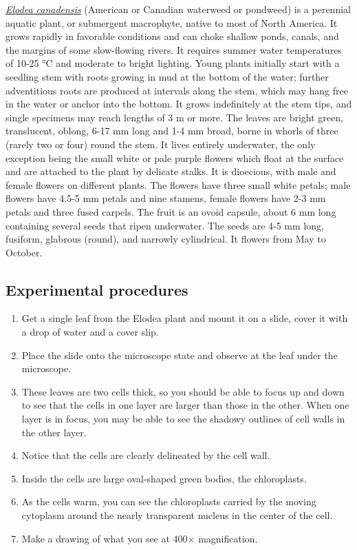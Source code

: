 \href{https://en.wikipedia.org/wiki/Elodea_canadensis}{\emph{Elodea
canadensis}} (American or Canadian waterweed or pondweed) is a perennial
aquatic plant, or submergent macrophyte, native to most of North
America. It grows rapidly in favorable conditions and can choke shallow
ponds, canals, and the margins of some slow-flowing rivers. It requires
summer water temperatures of 10-25 °C and moderate to bright lighting.
Young plants initially start with a seedling stem with roots growing in
mud at the bottom of the water; further adventitious roots are produced
at intervals along the stem, which may hang free in the water or anchor
into the bottom. It grows indefinitely at the stem tips, and single
specimens may reach lengths of 3 m or more. The leaves are bright green,
translucent, oblong, 6-17 mm long and 1-4 mm broad, borne in whorls of
three (rarely two or four) round the stem. It lives entirely underwater,
the only exception being the small white or pale purple flowers which
float at the surface and are attached to the plant by delicate stalks.
It is dioecious, with male and female flowers on different plants. The
flowers have three small white petals; male flowers have 4.5-5 mm petals
and nine stamens, female flowers have 2-3 mm petals and three fused
carpels. The fruit is an ovoid capsule, about 6 mm long containing
several seeds that ripen underwater. The seeds are 4-5 mm long,
fusiform, glabrous (round), and narrowly cylindrical. It flowers from
May to October.

\subsection{Experimental procedures}\label{experimental-procedures}

\begin{enumerate}
\def\labelenumi{\arabic{enumi}.}
\tightlist
\item
  Get a single leaf from the Elodea plant and mount it on a slide, cover
  it with a drop of water and a cover slip.
\item
  Place the slide onto the microscope state and observe at the leaf
  under the microscope.
\item
  These leaves are two cells thick, so you should be able to focus up
  and down to see that the cells in one layer are larger than those in
  the other. When one layer is in focus, you may be able to see the
  shadowy outlines of cell walls in the other layer.
\item
  Notice that the cells are clearly delineated by the cell wall.
\item
  Inside the cells are large oval-shaped green bodies, the chloroplasts.
\item
  As the cells warm, you can see the chloroplasts carried by the moving
  cytoplasm around the nearly transparent nucleus in the center of the
  cell.
\item
  Make a drawing of what you see at 400× magnification.
\end{enumerate}


